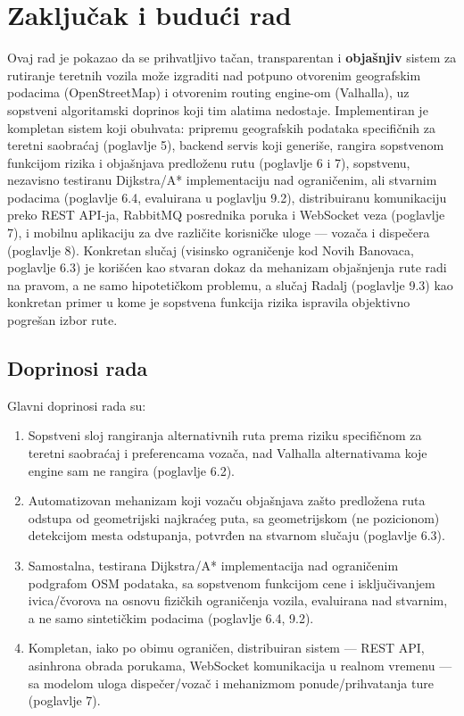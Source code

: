 \chapter{Zaključak i budući rad}

Ovaj rad je pokazao da se prihvatljivo tačan, transparentan i \textbf{objašnjiv} sistem za rutiranje teretnih vozila može izgraditi nad potpuno otvorenim geografskim podacima (OpenStreetMap) i otvorenim routing engine-om (Valhalla), uz sopstveni algoritamski doprinos koji tim alatima nedostaje. Implementiran je kompletan sistem koji obuhvata: pripremu geografskih podataka specifičnih za teretni saobraćaj (poglavlje 5), backend servis koji generiše, rangira sopstvenom funkcijom rizika i objašnjava predloženu rutu (poglavlje 6 i 7), sopstvenu, nezavisno testiranu Dijkstra/A* implementaciju nad ograničenim, ali stvarnim podacima (poglavlje 6.4, evaluirana u poglavlju 9.2), distribuiranu komunikaciju preko REST API-ja, RabbitMQ posrednika poruka i WebSocket veza (poglavlje 7), i mobilnu aplikaciju za dve različite korisničke uloge — vozača i dispečera (poglavlje 8). Konkretan slučaj (visinsko ograničenje kod Novih Banovaca, poglavlje 6.3) je korišćen kao stvaran dokaz da mehanizam objašnjenja rute radi na pravom, a ne samo hipotetičkom problemu, a slučaj Radalj (poglavlje 9.3) kao konkretan primer u kome je sopstvena funkcija rizika ispravila objektivno pogrešan izbor rute.

\section{Doprinosi rada}

Glavni doprinosi rada su:

\begin{enumerate}
\item Sopstveni sloj rangiranja alternativnih ruta prema riziku specifičnom za teretni saobraćaj i preferencama vozača, nad Valhalla alternativama koje engine sam ne rangira (poglavlje 6.2).
\item Automatizovan mehanizam koji vozaču objašnjava zašto predložena ruta odstupa od geometrijski najkraćeg puta, sa geometrijskom (ne pozicionom) detekcijom mesta odstupanja, potvrđen na stvarnom slučaju (poglavlje 6.3).
\item Samostalna, testirana Dijkstra/A* implementacija nad ograničenim podgrafom OSM podataka, sa sopstvenom funkcijom cene i isključivanjem ivica/čvorova na osnovu fizičkih ograničenja vozila, evaluirana nad stvarnim, a ne samo sintetičkim podacima (poglavlje 6.4, 9.2).
\item Kompletan, iako po obimu ograničen, distribuiran sistem — REST API, asinhrona obrada porukama, WebSocket komunikacija u realnom vremenu — sa modelom uloga dispečer/vozač i mehanizmom ponude/prihvatanja ture (poglavlje 7).
\end{enumerate}

